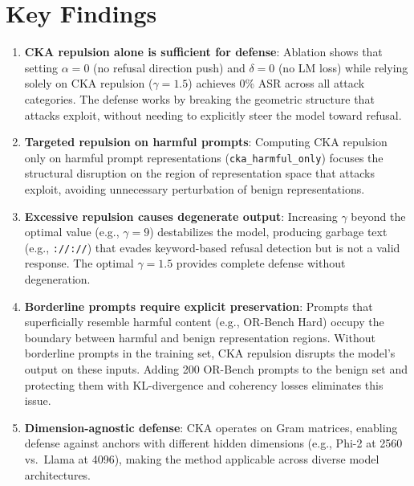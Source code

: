 \documentclass[11pt]{article}
\begin{document}
\section{Key Findings}

\begin{enumerate}
    \item \textbf{CKA repulsion alone is sufficient for defense}: Ablation shows that setting $\alpha = 0$ (no refusal direction push) and $\delta = 0$ (no LM loss) while relying solely on CKA repulsion ($\gamma = 1.5$) achieves 0\% ASR across all attack categories. The defense works by breaking the geometric structure that attacks exploit, without needing to explicitly steer the model toward refusal.

    \item \textbf{Targeted repulsion on harmful prompts}: Computing CKA repulsion only on harmful prompt representations (\texttt{cka\_harmful\_only}) focuses the structural disruption on the region of representation space that attacks exploit, avoiding unnecessary perturbation of benign representations.

    \item \textbf{Excessive repulsion causes degenerate output}: Increasing $\gamma$ beyond the optimal value (e.g., $\gamma = 9$) destabilizes the model, producing garbage text (e.g., \texttt{://://}) that evades keyword-based refusal detection but is not a valid response. The optimal $\gamma = 1.5$ provides complete defense without degeneration.

    \item \textbf{Borderline prompts require explicit preservation}: Prompts that superficially resemble harmful content (e.g., OR-Bench Hard) occupy the boundary between harmful and benign representation regions. Without borderline prompts in the training set, CKA repulsion disrupts the model's output on these inputs. Adding 200 OR-Bench prompts to the benign set and protecting them with KL-divergence and coherency losses eliminates this issue.

    \item \textbf{Dimension-agnostic defense}: CKA operates on Gram matrices, enabling defense against anchors with different hidden dimensions (e.g., Phi-2 at 2560 vs.\ Llama at 4096), making the method applicable across diverse model architectures.
\end{enumerate}
\end{document}
